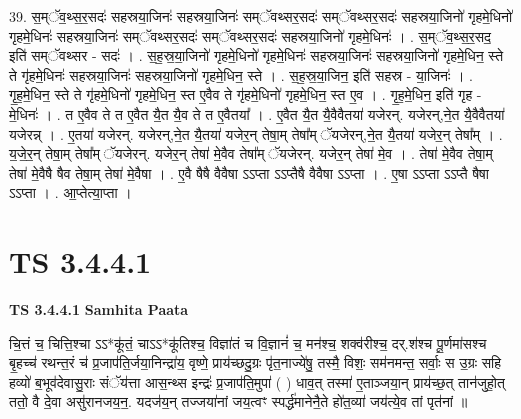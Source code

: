 \documentclass[17pt]{extarticle}
\begin{document}
39. स॒म्ॅव॒थ्स॒र॒सदः॑ सहस्रया॒जिनः॑ सहस्रया॒जिनः॑ सम्ॅवथ्सर॒सदः॑ सम्ॅवथ्सर॒सदः॑ सहस्रया॒जिनो॑ गृहमे॒धिनो॑ गृहमे॒धिनः॑ सहस्रया॒जिनः॑ सम्ॅवथ्सर॒सदः॑ सम्ॅवथ्सर॒सदः॑ सहस्रया॒जिनो॑ गृहमे॒धिनः॑ । . स॒म्ॅव॒थ्स॒र॒सद॒ इति॑ सम्ॅवथ्सर - सदः॑ । . स॒ह॒स्र॒या॒जिनो॑ गृहमे॒धिनो॑ गृहमे॒धिनः॑ सहस्रया॒जिनः॑ सहस्रया॒जिनो॑ गृहमे॒धिन॒ स्ते ते गृ॑हमे॒धिनः॑ सहस्रया॒जिनः॑ सहस्रया॒जिनो॑ गृहमे॒धिन॒ स्ते । . स॒ह॒स्र॒या॒जिन॒ इति॑ सहस्र - या॒जिनः॑ । . गृ॒ह॒मे॒धिन॒ स्ते ते गृ॑हमे॒धिनो॑ गृहमे॒धिन॒ स्त ए॒वैव ते गृ॑हमे॒धिनो॑ गृहमे॒धिन॒ स्त ए॒व । . गृ॒ह॒मे॒धिन॒ इति॑ गृह - मे॒धिनः॑ । . त ए॒वैव ते त ए॒वैत यै॒त यै॒व ते त ए॒वैतया᳚ । . ए॒वैत यै॒त यै॒वैवैतया॑ यजेरन्. यजेरन्,ने॒त यै॒वैवैतया॑ यजेरन्न् । . ए॒तया॑ यजेरन्. यजेरन्,ने॒त यै॒तया॑ यजेर॒न् तेषा॒म् तेषा᳚म् ॅयजेरन्,ने॒त यै॒तया॑ यजेर॒न् तेषा᳚म् । . य॒जे॒र॒न् तेषा॒म् तेषा᳚म् ॅयजेरन्. यजेर॒न् तेषा॑ मे॒वैव तेषा᳚म् ॅयजेरन्. यजेर॒न् तेषा॑ मे॒व । . तेषा॑ मे॒वैव तेषा॒म् तेषा॑ मे॒वैषै षैव तेषा॒म् तेषा॑ मे॒वैषा । . ए॒वै षैषै वैवैषा ऽऽप्ता ऽऽप्तैषै वैवैषा ऽऽप्ता । . ए॒षा ऽऽप्ता ऽऽप्तै षैषा ऽऽप्ता । . आ॒प्तेत्या॒प्ता । \newline
\pagebreak
{}

\section{ TS 3.4.4.1 }

\textbf{TS 3.4.4.1 } \newline
\textbf{Samhita Paata} \newline

चि॒त्तं च॒ चित्ति॒श्चा ऽऽ*कू॑तं॒ चाऽऽ*कू॑तिश्च॒ विज्ञा॑तं च वि॒ज्ञानं॑ च॒ मन॑श्च॒ शक्व॑रीश्च॒ दर्.श॑श्च पू॒र्णमा॑सश्च बृ॒हच्च॑ रथन्त॒रं च॑ प्र॒जाप॑ति॒र्जया॒निन्द्रा॑य॒ वृष्णे॒ प्राय॑च्छदु॒ग्रः पृ॑त॒नाज्ये॑षु॒ तस्मै॒ विशः॒ सम॑नमन्त॒ सर्वाः॒ स उ॒ग्रः सहि हव्यो॑ ब॒भूव॑देवासु॒राः संॅय॑त्ता आस॒न्थ्स इन्द्रः॑ प्र॒जाप॑ति॒मुपा॑ ( ) धाव॒त् तस्मा॑ ए॒ताञ्जया॒न् प्राय॑च्छ॒त् तान॑जुहो॒त् ततो॒ वै दे॒वा असु॑रानजय॒न॒. यदज॑य॒न् तज्जया॑नां जय॒त्वꣳ स्पर्द्ध॑मानेनै॒ते हो॑त॒व्या॑ जय॑त्ये॒व तां पृत॑नां ॥ \newline
\end{document}
